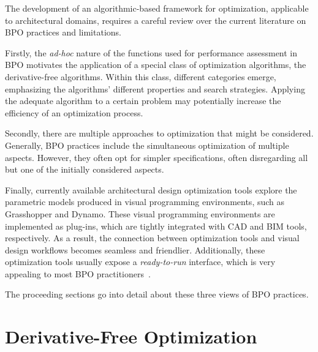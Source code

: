 \cleardoublepage
\label{chap:back}

	The development of an algorithmic-based framework for optimization, applicable to architectural domains, requires a careful review over the current literature on \ac{BPO} practices and limitations. 
	
	Firstly, the \textit{ad-hoc} nature of the functions used for performance assessment in \ac{BPO} motivates the application of a special class of optimization algorithms, the derivative-free algorithms. Within this class, different categories emerge, emphasizing the algorithms' different properties and search strategies. Applying the adequate algorithm to a certain problem may potentially increase the efficiency of an optimization process. 
	
	Secondly, there are multiple approaches to optimization that might be considered. Generally, \ac{BPO} practices include the simultaneous optimization of multiple aspects. However, they often opt for simpler specifications, often disregarding all but one of the initially considered aspects. 

	Finally, currently available architectural design optimization tools explore the parametric models produced in visual programming environments, such as Grasshopper and Dynamo. These visual programming environments are implemented as plug-ins, which are tightly integrated with \ac{CAD} and \ac{BIM} tools, respectively. As a result, the connection between optimization tools and visual design workflows becomes seamless and friendlier. Additionally, these optimization tools usually expose a \textit{ready-to-run} interface, which is very appealing to most \ac{BPO} practitioners~\cite{Cichocka2017SURVEY}.
	
	The proceeding sections go into detail about these three views of \ac{BPO} practices.
	
\section{Derivative-Free Optimization}
\label{sec:dfo}


